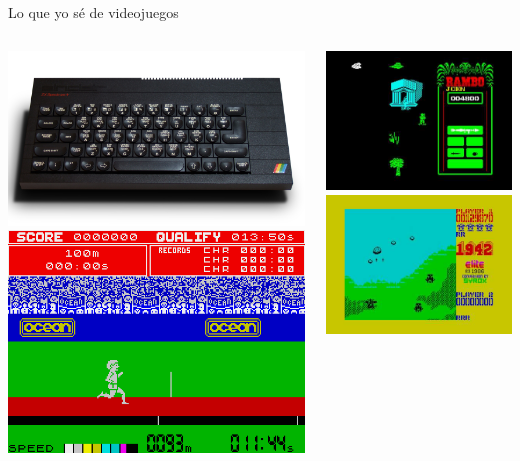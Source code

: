 \begin{frame}[t]{Lo que yo sé de videojuegos}
\pause
\begin{columns}[T]


\includegraphics[width=.7\textwidth]{figs/zx-spectrum}
\vspace{1cm}
\includegraphics[width=.7\textwidth]{figs/decathlon}


\includegraphics[width=.6\textwidth]{figs/rambo}
\vspace{1cm}
\includegraphics[width=.6\textwidth]{figs/1942}

\end{columns}
\end{frame}

